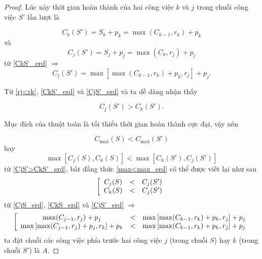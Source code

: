 \documentclass[12pt,a4paper]{report}
\begin{document}
\begin{proof}
	Lúc này thời gian hoàn thành của hai công việc $k$ và $j$ trong chuỗi công việc $S'$ lần lượt là
	
	\begin{equation} \label{CkS'_erd}
		C_k(S') = S_k + p_k = \max (C_{k-1} , r_k ) + p_k
	\end{equation}
	và
	\begin{equation} \label{CjS'_erd}
		C_j(S') = S_j + p_j = \max (C_k , r_j ) + p_j
	\end{equation}
	từ \eqref{CkS'_erd}
	$\Rightarrow$
	\begin{equation} \label{CjS'_erd}
		C_j(S') = \max \left[ \max (C_{k-1} , r_k) + p_k , r_j \right] +p_j.
	\end{equation}

	Từ \eqref{rj<rk}, \eqref{CkS'_erd} và \eqref{CjS'_erd} và  ta dễ dàng nhận thấy

	\begin{equation} \label{CjS'>CkS'_erd}
		C_j(S') > C_k(S').
	\end{equation}

	Mục đích của thuật toán là tối thiểu thời gian hoàn thành cực đại, vậy nên

	\begin{equation} \label{C<C}
		C_{\max}(S) < C_{\max}(S')
	\end{equation}
	hay
	\begin{equation} \label{max<max_erd}
	\max \left[ C_j(S), C_k(S) \right] < \max \left[ C_k(S'), C_j(S') \right] 
	\end{equation}
	từ \eqref{CjS'>CkS'_erd}, bất đẳng thức \eqref{max<max_erd} có thể được viết lại như sau
	\begin{equation}
		\left[
			\begin{array}{c c c}
				C_j(S) &<& C_j(S') \\
				C_k(S) &<& C_j(S')
			\end{array}
		\right.
	\end{equation}
	từ \eqref{CjS_erd}, \eqref{CkS_erd} và \eqref{CjS'_erd}
	$\Rightarrow$
	\begin{equation} \label{hbdt_erd}
		\left[
			\begin{array}{c c c}
				\max (C_{j-1}, r_j) + p_j &<& \max \left[ \max (C_{k-1}, r_k) + p_k, r_j \right] + p_j \\
				\max \left[ \max (C_{j-1}, r_j) + p_j, r_k \right] + p_k &<& \max \left[ \max (C_{k-1}, r_k) + p_k, r_j \right] + p_j
			\end{array}
		\right.
	\end{equation}
	ta đặt chuỗi các công việc phía trước hai công việc $j$ (trong chuỗi $S$) hay $k$ (trong chuỗi $S'$) là $A$.
	

\end{proof}
\end{document}
